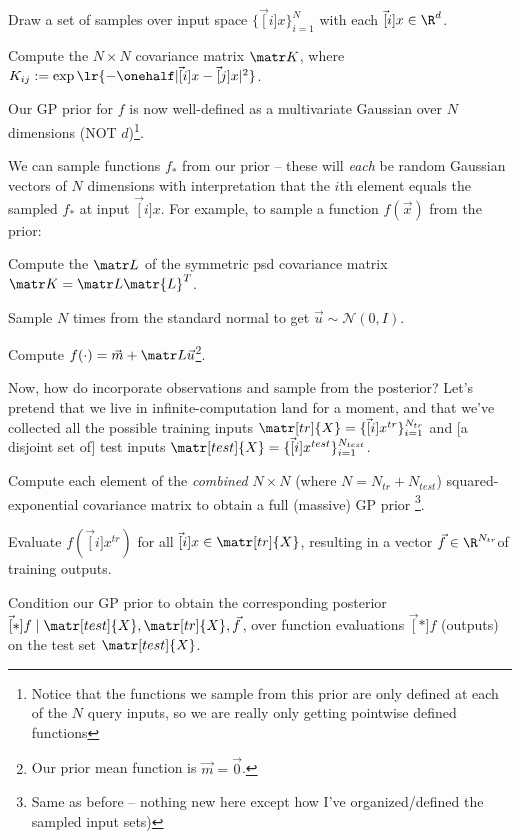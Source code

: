 \documentclass[11pt]{article}
\begin{document}
\begin{compactitem}
	\item Draw a set of samples over input space $\{\vec[i]{x}\}_{i=1}^N$ with each $\vec[i]{x} \in \R^d$. 
	\item Compute the $N \times N$ covariance matrix $\matr K$, where $K_{ij} := \exp\lr{ -\onehalf |  \vec[i]{x} - \vec[j]{x} |^2 }$. 
	\item Our GP prior for $f$ is now well-defined as a multivariate Gaussian over $N$ dimensions (NOT $d$)\footnote{Notice that the functions we sample from this prior are only defined at each of the $N$ query inputs, so we are really only getting pointwise defined functions\textellipsis}. 
	\item We can sample functions $f_*$ from our prior -- these will \textit{each} be random Gaussian vectors of $N$ dimensions with interpretation that the $i$th element equals the sampled $f_*$ at input $\vec[i]{x}$. For example, to sample a function $f(\vec x)$ from the prior:
	\begin{compactenum}
		\item Compute the  $\matr L$ of the symmetric psd covariance matrix $\matr K = \matr L \matr{L}^T$. 
		
		\item Sample $N$ times from the standard normal to get $\vec u \sim \mathcal{N}(0, I)$. 
		
		\item Compute $f(\cdot) = \vec m +  \matr L \vec u$\footnote{Our prior mean function is $\vec m = \vec 0$.}.
	\end{compactenum}
\end{compactitem}
Now, how do incorporate observations and sample from the posterior? Let's pretend that we live in infinite-computation land for a moment, and that we've collected all the possible training inputs $\matr[tr]{X} = \{\vec[i]{x}^{tr}\}_{i=1}^{N_{tr}}$ and [a disjoint set of] test inputs  $\matr[test]{X} = \{\vec[i]{x}^{test}\}_{i=1}^{N_{test}}$. 
\begin{compactenum}
	\item Compute each element of the \textit{combined} $N \times N$ (where $N = N_{tr} + N_{test}$) squared-exponential covariance matrix to obtain a full (massive) GP prior \footnote{Same as before -- nothing new here except how I've organized/defined the sampled input sets)}. 
	
	\item Evaluate $f(\vec[i]{x}^{tr})$ for all $\vec[i]{x} \in \matr[tr]{X}$, resulting in a vector $\vec f \in \R^{N_{tr}}$of training outputs. 
	
	\item Condition our GP prior to obtain the corresponding posterior $\vec[*]{f} \mid \matr[test]{X}, \matr[tr]{X}, \vec{f}$, over function evaluations $\vec[*]{f}$ (outputs) on the test set $\matr[test]{X}$.
\end{compactenum}
\end{document}
